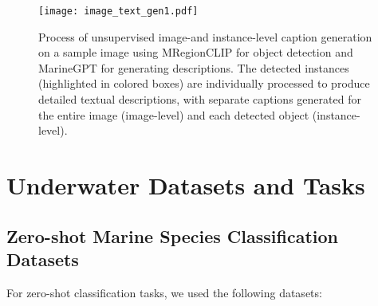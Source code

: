  

\begin{figure*}[t!]
\centering
\texttt{[image: image\_text\_gen1.pdf]}
\caption{Process of unsupervised image-and instance-level caption generation on a sample image using MRegionCLIP for object detection and MarineGPT \cite{zheng2023marinegpt} for generating descriptions. 
The detected instances (highlighted in colored boxes) are individually processed to produce detailed textual descriptions, with separate captions generated for the entire image (image-level) and each detected object (instance-level).}
\label{fig:sample1}
\end{figure*}




\begin{comment}
\begin{figure*}[t!]
\centering
\texttt{[image: image\_text\_gen2.pdf]}
\caption{Unsupervised image and instance levels captions generation processes on a sample image using object detector MRegionCLIP and MarineGPT \cite{zheng2023marinegpt}. }
\label{fig:sample2}
\end{figure*}
\end{comment}


\begin{comment}
\begin{figure*}[t!]
\centering
\texttt{[image: image\_text\_gen3.pdf]}
\caption{Unsupervised image and instance levels captions generation processes on a sample image using object detector MRegionCLIP and MarineGPT \cite{zheng2023marinegpt}. }
\label{fig:sample3}
\end{figure*}
\end{comment}

\section{Underwater Datasets and Tasks}
\label{datasets}
\subsection{Zero-shot Marine Species Classification Datasets}
For zero-shot classification tasks, we used the following datasets:

